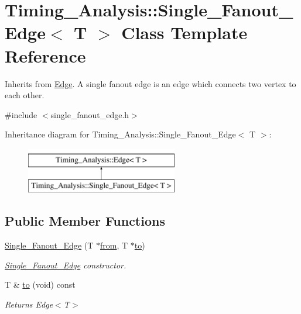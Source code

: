 \hypertarget{classTiming__Analysis_1_1Single__Fanout__Edge}{\section{Timing\-\_\-\-Analysis\-:\-:Single\-\_\-\-Fanout\-\_\-\-Edge$<$ T $>$ Class Template Reference}
\label{classTiming__Analysis_1_1Single__Fanout__Edge}
}


Inherits from \hyperlink{classTiming__Analysis_1_1Edge}{Edge}. A single fanout edge is an edge which connects two vertex to each other.  




{\ttfamily \#include $<$single\-\_\-fanout\-\_\-edge.\-h$>$}

Inheritance diagram for Timing\-\_\-\-Analysis\-:\-:Single\-\_\-\-Fanout\-\_\-\-Edge$<$ T $>$\-:\begin{figure}[H]
\begin{center}
\leavevmode
\includegraphics[height=2.000000cm]{classTiming__Analysis_1_1Single__Fanout__Edge}
\end{center}
\end{figure}
\subsection*{Public Member Functions}
\begin{DoxyCompactItemize}
\item 
\hyperlink{classTiming__Analysis_1_1Single__Fanout__Edge_ac588152ff213288a57a744374039790a}{Single\-\_\-\-Fanout\-\_\-\-Edge} (T $\ast$\hyperlink{classTiming__Analysis_1_1Edge_a47020ea89fd9fde438adc814a731a23d}{from}, T $\ast$\hyperlink{classTiming__Analysis_1_1Single__Fanout__Edge_ac01deccce158b6cee6883924e6dcb788}{to})
\begin{DoxyCompactList}\small\item\em \hyperlink{classTiming__Analysis_1_1Single__Fanout__Edge}{Single\-\_\-\-Fanout\-\_\-\-Edge} constructor. \end{DoxyCompactList}\item 
T \& \hyperlink{classTiming__Analysis_1_1Single__Fanout__Edge_ac01deccce158b6cee6883924e6dcb788}{to} (void) const 
\begin{DoxyCompactList}\small\item\em Returns Edge$<$\-T$>$ \end{DoxyCompactList}\end{DoxyCompactItemize}
